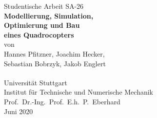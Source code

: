 %
%

\begin{titlepage}
\vspace*{13mm}
\begin{center}
  \vspace{10mm} 
         {\large \hspace{13mm} Studentische Arbeit SA-26\\}
  \vspace{10mm}
         {\Large
          \bf
          \hspace{20mm}Modellierung, Simulation, \\} 
        {\Large
          \bf
          \hspace{20mm}Optimierung und Bau \\} 
       {\Large
          \bf
          \hspace{20mm}eines Quadrocopters\\}
  \vspace{10mm}
         {\large \hspace{20mm}von}\\
         {\large \hspace{20mm}Hannes Pfitzner, Joachim Hecker, }\\
         {\large \hspace{20mm}Sebastian Bobrzyk, Jakob Englert}\\
  \vspace{30mm}
  \makebox[40mm]{}\\
  \vspace{50mm}
         {\large \hspace{20mm} Universität Stuttgart} \\
         {\large \hspace{20mm} Institut für Technische und Numerische Mechanik}\\
         {\large \hspace{20mm} Prof.\ Dr.-Ing.\ Prof.\ E.h.\ P.\ Eberhard}\\
  \vspace{5mm}
         {\large \hspace{20mm} Juni 2020}
\end{center}
\end{titlepage}

\clearpage
\thispagestyle{empty}
\cleardoublepage